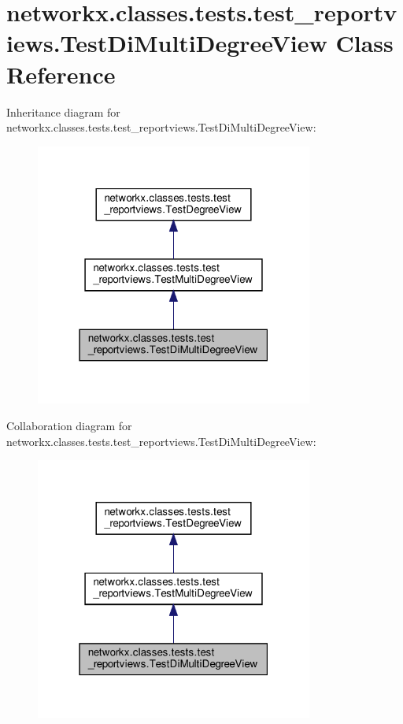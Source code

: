 \hypertarget{classnetworkx_1_1classes_1_1tests_1_1test__reportviews_1_1TestDiMultiDegreeView}{}\section{networkx.\+classes.\+tests.\+test\+\_\+reportviews.\+Test\+Di\+Multi\+Degree\+View Class Reference}
\label{classnetworkx_1_1classes_1_1tests_1_1test__reportviews_1_1TestDiMultiDegreeView}


Inheritance diagram for networkx.\+classes.\+tests.\+test\+\_\+reportviews.\+Test\+Di\+Multi\+Degree\+View\+:
\nopagebreak
\begin{figure}[H]
\begin{center}
\leavevmode
\includegraphics[width=259pt]{classnetworkx_1_1classes_1_1tests_1_1test__reportviews_1_1TestDiMultiDegreeView__inherit__graph}
\end{center}
\end{figure}


Collaboration diagram for networkx.\+classes.\+tests.\+test\+\_\+reportviews.\+Test\+Di\+Multi\+Degree\+View\+:
\nopagebreak
\begin{figure}[H]
\begin{center}
\leavevmode
\includegraphics[width=259pt]{classnetworkx_1_1classes_1_1tests_1_1test__reportviews_1_1TestDiMultiDegreeView__coll__graph}
\end{center}
\end{figure}
